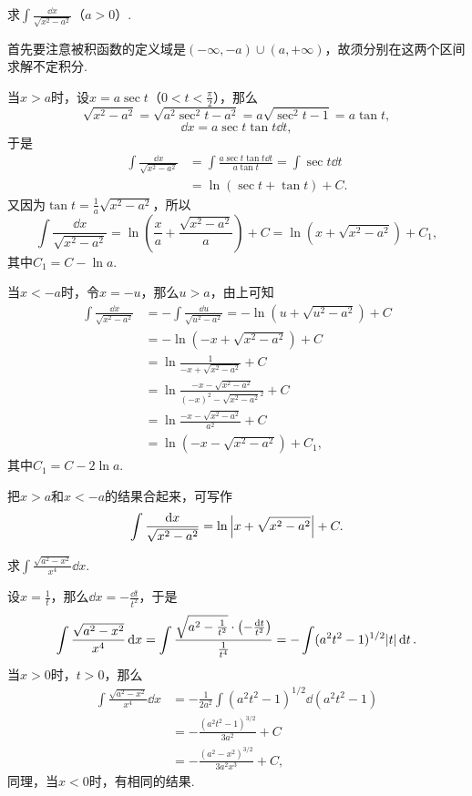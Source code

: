 \begin{example}
求\(\int \frac{\dd{x}}{\sqrt{x^2 - a^2}}\)（\(a>0\)）.
\begin{solution}
首先要注意被积函数的定义域是\((-\infty,-a)\cup(a,+\infty)\)，故须分别在这两个区间求解不定积分.

当\(x > a\)时，设\(x = a \sec t\)（\(0 < t < \frac{\pi}{2}\)），那么\[
\sqrt{x^2 - a^2} = \sqrt{a^2 \sec^2 t - a^2} = a \sqrt{\sec^2 t - 1} = a \tan t,
\]\[
\dd{x} = a \sec t \tan t \dd{t},
\]于是\begin{align*}
\int \frac{\dd{x}}{\sqrt{x^2 - a^2}}
&= \int \frac{a \sec t \tan t \dd{t}}{a \tan t}
= \int \sec t \dd{t} \\
&= \ln(\sec t + \tan t) + C.
\end{align*}又因为\(\tan t = \frac{1}{a} \sqrt{x^2 - a^2}\)，所以\[
\int \frac{\dd{x}}{\sqrt{x^2 - a^2}}
= \ln( \frac{x}{a} + \frac{\sqrt{x^2 - a^2}}{a} ) + C
= \ln( x + \sqrt{x^2 - a^2} ) + C_1,
\]其中\(C_1 = C - \ln a\).

当\(x < -a\)时，令\(x = -u\)，那么\(u > a\)，由上可知\begin{align*}
\int \frac{\dd{x}}{\sqrt{x^2 - a^2}}
&= -\int \frac{\dd{u}}{\sqrt{u^2 - a^2}}
= -\ln(u + \sqrt{u^2 - a^2}) + C \\
&= -\ln(-x + \sqrt{x^2 - a^2}) + C \\
&= \ln\frac{1}{-x + \sqrt{x^2 - a^2}} + C \\
&= \ln\frac{-x - \sqrt{x^2 - a^2}}{(-x)^2 - \sqrt{x^2 - a^2}^2} + C \\
&= \ln\frac{-x - \sqrt{x^2 - a^2}}{a^2} + C \\
&= \ln(-x - \sqrt{x^2 - a^2}) + C_1,
\end{align*}其中\(C_1 = C - 2 \ln a\).

把\(x > a\)和\(x < -a\)的结果合起来，可写作\[
\int \frac{\dd{x}}{\sqrt{x^2 - a^2}}
= \ln\abs{x + \sqrt{x^2 - a^2}} + C.
\]
\end{solution}
\end{example}

\begin{example}
求\(\int \frac{\sqrt{a^2 - x^2}}{x^4} \dd{x}\).
\begin{solution}
设\(x = \frac{1}{t}\)，那么\(\dd{x} = -\frac{\dd{t}}{t^2}\)，于是\[
\int \frac{\sqrt{a^2 - x^2}}{x^4} \dd{x}
= \int \frac{\sqrt{a^2 - \frac{1}{t^2}} \cdot \left( -\frac{\dd{t}}{t^2} \right)}{\frac{1}{t^4}}
= -\int (a^2 t^2 - 1)^{1/2} \abs{t} \dd{t}.
\]当\(x > 0\)时，\(t > 0\)，那么\begin{align*}
\int \frac{\sqrt{a^2 - x^2}}{x^4} \dd{x}
&= -\frac{1}{2a^2} \int (a^2 t^2 - 1)^{1/2} \dd(a^2 t^2 - 1) \\
&= -\frac{(a^2 t^2 - 1)^{3/2}}{3 a^2} + C \\
&= -\frac{(a^2 - x^2)^{3/2}}{3 a^2 x^3} + C,
\end{align*}
同理，当\(x < 0\)时，有相同的结果.
\end{solution}
\end{example}

